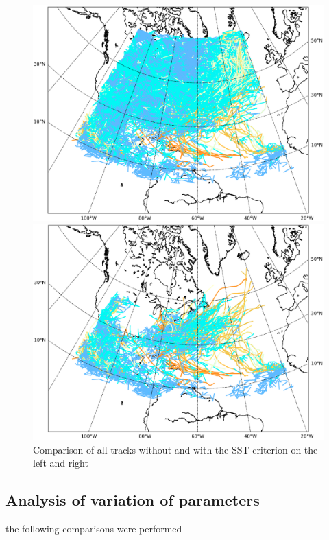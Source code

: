 \begin{figure}[ht]
	\begin{minipage}[t]{0.48\textwidth}
		\includegraphics[width = \textwidth]{img/all_tracks.png}
	\end{minipage}
	\hfill
	\begin{minipage}[t]{0.48\textwidth}
		\includegraphics[width = \textwidth]{img/all_tracks_sst.png}
	\end{minipage}
	\caption{Comparison of all tracks without and with the SST criterion on the left and right}
	\label{fig:sst-effect}
\end{figure}
\subsection{Analysis of variation of parameters}
the following comparisons were performed